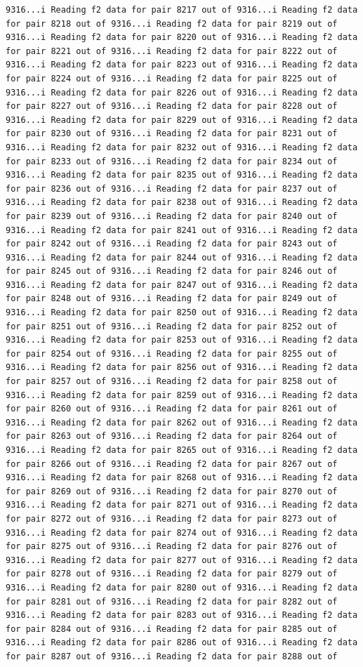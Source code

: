 \documentclass[
]{article}
\begin{document}
\begin{verbatim}
9316...i Reading f2 data for pair 8217 out of 9316...i Reading f2 data for pair 8218 out of 9316...i Reading f2 data for pair 8219 out of 9316...i Reading f2 data for pair 8220 out of 9316...i Reading f2 data for pair 8221 out of 9316...i Reading f2 data for pair 8222 out of 9316...i Reading f2 data for pair 8223 out of 9316...i Reading f2 data for pair 8224 out of 9316...i Reading f2 data for pair 8225 out of 9316...i Reading f2 data for pair 8226 out of 9316...i Reading f2 data for pair 8227 out of 9316...i Reading f2 data for pair 8228 out of 9316...i Reading f2 data for pair 8229 out of 9316...i Reading f2 data for pair 8230 out of 9316...i Reading f2 data for pair 8231 out of 9316...i Reading f2 data for pair 8232 out of 9316...i Reading f2 data for pair 8233 out of 9316...i Reading f2 data for pair 8234 out of 9316...i Reading f2 data for pair 8235 out of 9316...i Reading f2 data for pair 8236 out of 9316...i Reading f2 data for pair 8237 out of 9316...i Reading f2 data for pair 8238 out of 9316...i Reading f2 data for pair 8239 out of 9316...i Reading f2 data for pair 8240 out of 9316...i Reading f2 data for pair 8241 out of 9316...i Reading f2 data for pair 8242 out of 9316...i Reading f2 data for pair 8243 out of 9316...i Reading f2 data for pair 8244 out of 9316...i Reading f2 data for pair 8245 out of 9316...i Reading f2 data for pair 8246 out of 9316...i Reading f2 data for pair 8247 out of 9316...i Reading f2 data for pair 8248 out of 9316...i Reading f2 data for pair 8249 out of 9316...i Reading f2 data for pair 8250 out of 9316...i Reading f2 data for pair 8251 out of 9316...i Reading f2 data for pair 8252 out of 9316...i Reading f2 data for pair 8253 out of 9316...i Reading f2 data for pair 8254 out of 9316...i Reading f2 data for pair 8255 out of 9316...i Reading f2 data for pair 8256 out of 9316...i Reading f2 data for pair 8257 out of 9316...i Reading f2 data for pair 8258 out of 9316...i Reading f2 data for pair 8259 out of 9316...i Reading f2 data for pair 8260 out of 9316...i Reading f2 data for pair 8261 out of 9316...i Reading f2 data for pair 8262 out of 9316...i Reading f2 data for pair 8263 out of 9316...i Reading f2 data for pair 8264 out of 9316...i Reading f2 data for pair 8265 out of 9316...i Reading f2 data for pair 8266 out of 9316...i Reading f2 data for pair 8267 out of 9316...i Reading f2 data for pair 8268 out of 9316...i Reading f2 data for pair 8269 out of 9316...i Reading f2 data for pair 8270 out of 9316...i Reading f2 data for pair 8271 out of 9316...i Reading f2 data for pair 8272 out of 9316...i Reading f2 data for pair 8273 out of 9316...i Reading f2 data for pair 8274 out of 9316...i Reading f2 data for pair 8275 out of 9316...i Reading f2 data for pair 8276 out of 9316...i Reading f2 data for pair 8277 out of 9316...i Reading f2 data for pair 8278 out of 9316...i Reading f2 data for pair 8279 out of 9316...i Reading f2 data for pair 8280 out of 9316...i Reading f2 data for pair 8281 out of 9316...i Reading f2 data for pair 8282 out of 9316...i Reading f2 data for pair 8283 out of 9316...i Reading f2 data for pair 8284 out of 9316...i Reading f2 data for pair 8285 out of 9316...i Reading f2 data for pair 8286 out of 9316...i Reading f2 data for pair 8287 out of 9316...i Reading f2 data for pair 8288 out of 
\end{verbatim}
\end{document}
